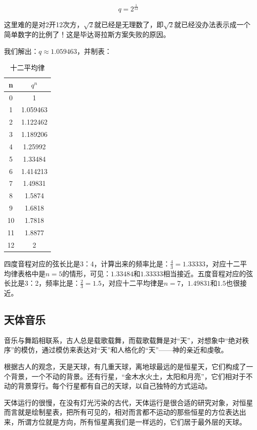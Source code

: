 \begin{equation*}
q = 2^{\frac{1}{12}}
\end{equation*}

这里难的是对2开12次方，$\sqrt{2}$就已经是无理数了，即$\sqrt{2}$就已经没办法表示成一个简单数字的比例了！这是毕达哥拉斯方案失败的原因。

我们解出：$q \approx 1.059463 $，并制表：

\begin{table}[htdp]
\caption{十二平均律}
\begin{center}
\begin{tabular}{|c|c|}
\hline
n & $q^n$\\
\hline
0 & 1 \\
1& 1.059463 \\
2 & 1.122462 \\
3 & 1.189206 \\
4 & 1.25992 \\
5 & 1.33484 \\
6 & 1.414213 \\
7 & 1.49831 \\
8 & 1.5874 \\
9 & 1.6818 \\
10 & 1.7818 \\
11 & 1.8877 \\
12 & 2 \\
\hline
\end{tabular}
\end{center}
\label{default}
\end{table}%

四度音程对应的弦长比是3：4，计算出来的频率比是：$\frac{4}{3} = 1.33333$，对应十二平均律表格中是$n = 5$的情形，可见：$1.33484$和$1.33333$相当接近。五度音程对应的弦长比是3：2，频率比是：$\frac{2}{3} = 1.5$，对应十二平均律是$n=7$，$1.49831$和$1.5$也很接近。

\subsection{天体音乐}

音乐与舞蹈相联系，古人总是载歌载舞，而载歌载舞是对“天”，对想象中“绝对秩序”的模仿，通过模仿来表达对“天”和人格化的“天”——神的亲近和虔敬。

根据古人的观念，天是天球，有几重天球，离地球最远的是恒星天，它们构成了一个背景，一个不动的背景。还有行星，“金木水火土，太阳和月亮”，它们相对于不动的背景穿行。每个行星都有自己的天球，以自己独特的方式运动。

天体运行的很慢，在没有灯光污染的古代，天体运行是很合适的研究对象，对恒星而言就是绘制星表，把所有可见的，相对而言都不运动的那些恒星的方位表达出来，所谓方位就是方向，所有恒星离我们是一样远的，它们居于最外层的天球。

